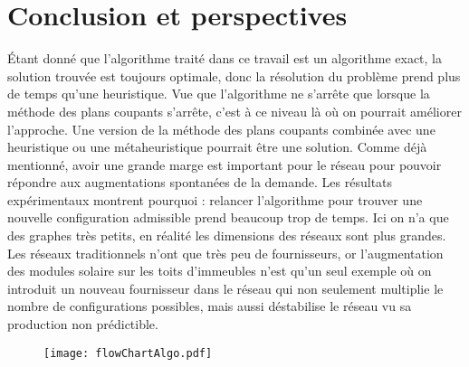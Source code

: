 \documentclass[letterpaper]{article}
\begin{document}
\section{Conclusion et perspectives}
Étant donné que l'algorithme traité dans ce travail est un algorithme exact, la solution trouvée est toujours optimale, donc la résolution du problème prend plus de temps qu'une heuristique. Vue que l'algorithme ne s'arrête que lorsque la méthode des plans coupants s'arrête, c'est à ce niveau là où on pourrait améliorer l'approche. Une version de la méthode des plans coupants combinée avec une heuristique ou une métaheuristique pourrait être une solution.\newline \indent
Comme déjà mentionné, avoir une grande marge est important pour le réseau pour pouvoir répondre aux augmentations spontanées de la demande. Les résultats expérimentaux montrent pourquoi : relancer l'algorithme pour trouver une nouvelle configuration admissible prend beaucoup trop de temps. Ici on n'a que des graphes très petits, en réalité les dimensions des réseaux sont plus grandes. Les réseaux traditionnels n'ont que très peu de fournisseurs, or l'augmentation des modules solaire sur les toits d'immeubles n'est qu'un seul exemple où on introduit un nouveau fournisseur dans le réseau qui non seulement multiplie le nombre de configurations possibles, mais aussi déstabilise le réseau vu sa production non prédictible.

\begin{figure}[h]
    \centering
    \texttt{[image: flowChartAlgo.pdf]}
    \label{fig:algo}
\end{figure}




\end{document}
